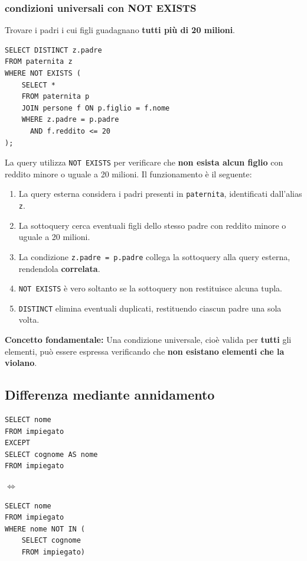\subsubsection*{condizioni universali con NOT EXISTS}
Trovare i padri i cui figli guadagnano \textbf{tutti più di 20 milioni}.
\begin{verbatim}
SELECT DISTINCT z.padre
FROM paternita z
WHERE NOT EXISTS (
    SELECT *
    FROM paternita p
    JOIN persone f ON p.figlio = f.nome
    WHERE z.padre = p.padre
      AND f.reddito <= 20
);
\end{verbatim}
La query utilizza \texttt{NOT EXISTS} per verificare che
\textbf{non esista alcun figlio} con reddito minore o uguale a 20 milioni.
Il funzionamento è il seguente:
\begin{enumerate}
    \item La query esterna considera i padri presenti in
    \texttt{paternita}, identificati dall'alias \texttt{z}.

    \item La sottoquery cerca eventuali figli dello stesso padre
    con reddito minore o uguale a 20 milioni.
    
    \item La condizione \texttt{z.padre = p.padre} collega
    la sottoquery alla query esterna, rendendola \textbf{correlata}.
    
    \item \texttt{NOT EXISTS} è vero soltanto se la sottoquery
    non restituisce alcuna tupla.
    
    \item \texttt{DISTINCT} elimina eventuali duplicati,
    restituendo ciascun padre una sola volta.
\end{enumerate}
\noindent
\textbf{Concetto fondamentale:}
Una condizione universale, cioè valida per \textbf{tutti}
gli elementi, può essere espressa verificando che
\textbf{non esistano elementi che la violano}.
\subsection{Differenza mediante annidamento}
\noindent
\begin{minipage}[c]{0.38\textwidth}
\footnotesize
\begin{verbatim}
SELECT nome
FROM impiegato
EXCEPT
SELECT cognome AS nome
FROM impiegato
\end{verbatim}
\end{minipage}%
\hspace{0.3cm}%
$\Longleftrightarrow$%
\hspace{0.3cm}%
\begin{minipage}[c]{0.5\textwidth}
\footnotesize
\begin{verbatim}
SELECT nome
FROM impiegato
WHERE nome NOT IN (
    SELECT cognome
    FROM impiegato)
\end{verbatim}
\end{minipage}
